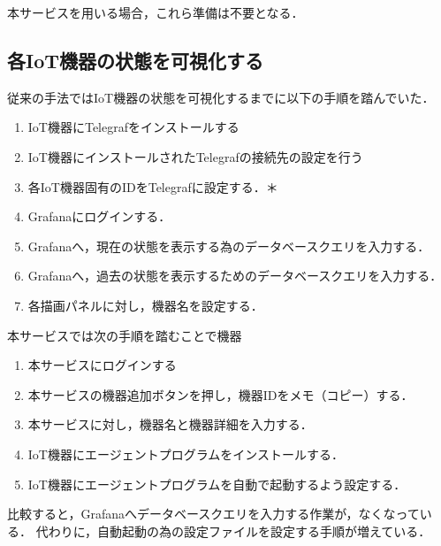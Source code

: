 本サービスを用いる場合，これら準備は不要となる．

\subsection{各IoT機器の状態を可視化する}
従来の手法ではIoT機器の状態を可視化するまでに以下の手順を踏んでいた．
\begin{enumerate}
\item IoT機器にTelegrafをインストールする
\item IoT機器にインストールされたTelegrafの接続先の設定を行う
\item 各IoT機器固有のIDをTelegrafに設定する．＊
\item Grafanaにログインする．
\item Grafanaへ，現在の状態を表示する為のデータベースクエリを入力する．
\item Grafanaへ，過去の状態を表示するためのデータベースクエリを入力する．
\item 各描画パネルに対し，機器名を設定する．
\end{enumerate}

本サービスでは次の手順を踏むことで機器
\begin{enumerate}
\item 本サービスにログインする
\item 本サービスの機器追加ボタンを押し，機器IDをメモ（コピー）する．
\item 本サービスに対し，機器名と機器詳細を入力する．
\item IoT機器にエージェントプログラムをインストールする．
\item IoT機器にエージェントプログラムを自動で起動するよう設定する．
\end{enumerate}

比較すると，Grafanaへデータベースクエリを入力する作業が，なくなっている．
代わりに，自動起動の為の設定ファイルを設定する手順が増えている．



